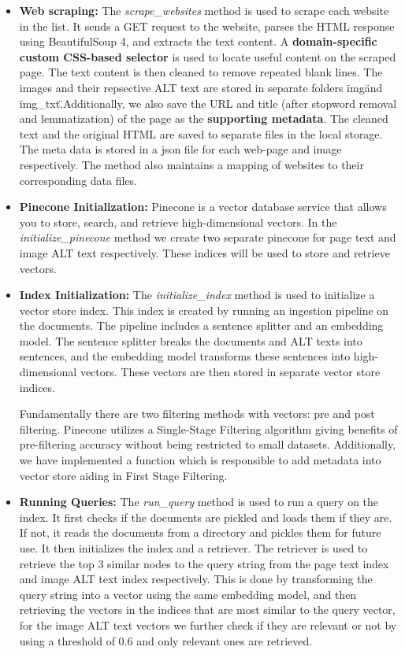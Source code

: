 \documentclass[sigconf,natbib=true,anonymous=false]{acmart}
\begin{document}
\begin{itemize}

\item \textbf{Web scraping:} The \textit{scrape\_websites} method is used to scrape each website in the list. It sends a GET request to the website, parses the HTML response using BeautifulSoup 4, and extracts the text content. A \textbf{domain-specific custom CSS-based selector} is used to locate useful content on the scraped page.
\newline
The text content is then cleaned to remove repeated blank lines. The images and their repsective ALT text are stored in separate folders \"img\" and \"img\_txt\".Additionally, we also save the URL and title (after stopword removal and lemmatization) of the page as the \textbf{supporting metadata}. The cleaned text and the original HTML are saved to separate files in the local storage. The meta data is stored in a json file for each web-page and image respectively. The method also maintains a mapping of websites to their corresponding data files.

\item \textbf{Pinecone Initialization:} Pinecone is a vector database service that allows you to store, search, and retrieve high-dimensional vectors. In the \textit{initialize\_pinecone} method we create two separate pinecone for page text and image ALT text respectively. These indices will be used to store and retrieve vectors.  

\item \textbf{Index Initialization:} The \textit{initialize\_index} method is used to initialize a vector store index. This index is created by running an ingestion pipeline on the documents. The pipeline includes a sentence splitter and an embedding model. The sentence splitter breaks the documents and ALT texts into sentences, and the embedding model transforms these sentences into high-dimensional vectors. These vectors are then stored in separate vector store indices. 

Fundamentally there are two filtering methods with vectors: pre and post filtering. Pinecone utilizes a Single-Stage Filtering algorithm giving benefits of pre-filtering accuracy without being restricted to small datasets. Additionally, we have implemented a function which is responsible to add metadata into vector store aiding in First Stage Filtering.

\item \textbf{Running Queries:} The \textit{run\_query} method is used to run a query on the index. It first checks if the documents are pickled and loads them if they are. If not, it reads the documents from a directory and pickles them for future use. It then initializes the index and a retriever. The retriever is used to retrieve the top 3 similar nodes to the query string from the page text index and image ALT text index respectively. This is done by transforming the query string into a vector using the same embedding model, and then retrieving the vectors in the indices that are most similar to the query vector, for the image ALT text vectors we further check if they are relevant or not by using a threshold of 0.6 and only relevant ones are retrieved. 


\end{itemize}
\end{document}
